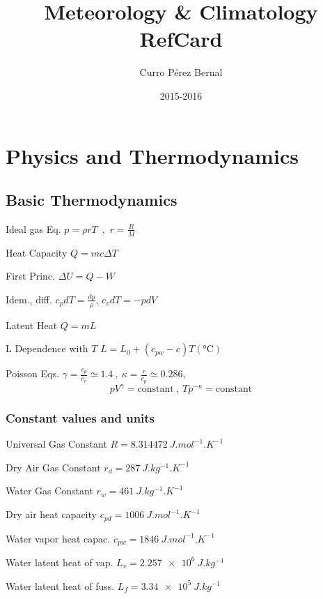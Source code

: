 \documentclass[10pt]{article}
\title{Meteorology \& Climatology RefCard}
\author{Curro Pérez Bernal}
\date{2015-2016}
\renewcommand{\maketitle}{%
{\begin{center}\Large \mythetitle\end{center}}
}
\newcommand{\gc}{\degreeCelsius}
\begin{document}
\begin{multicols}{3}
\maketitle

\section{Physics and Thermodynamics}

\subsection{Basic Thermodynamics}
\begin{ttdesc}[labelwidth=\widthof{\texttt{report}}]
\item[Ideal gas Eq.] $p = \rho r T$~,~$r = \frac{R}{M}$
\item[Heat Capacity] $Q = m c \Delta T$
\item[First Princ.] $\Delta U = Q - W$
\item[Idem., diff.] $c_pdT = \frac{dp}{\rho}$, $c_vdT = -pdV$
\item[Latent Heat] $Q = m L$
\item[L Dependence with $T$] $L=L_0 + (c_{pw}-c) T (\si{\gc})$
\item[Poisson Eqs.] $\gamma = \frac{c_p}{c_v}\simeq 1.4~,~\kappa = \frac{r}{c_p}\simeq 0.286$, 
\begin{displaymath}
  p V^\gamma = \text{constant}~,~T p^{-\kappa} = \text{constant}
\end{displaymath}
\end{ttdesc}
\subsubsection{Constant values and units}
%
\begin{ttdesc}[labelwidth=\widthof{\ttfamily{letterpaper/a4paper}}]
\item[Universal Gas Constant] $R = \SI{8.314472}{J.mol^{-1}.K^{-1}}$
\item[Dry Air Gas Constant] $r_d = \SI{287}{J.kg^{-1}.K^{-1}}$
\item[Water Gas Constant] $r_w = \SI{461}{J.kg^{-1}.K^{-1}}$
\item[Dry air heat capacity] $c_{pd} = \SI{1006}{J.mol^{-1}.K^{-1}}$
\item[Water vapor heat capac.] $c_{pw} = \SI{1846}{J.mol^{-1}.K^{-1}}$
\item[Water latent heat of vap.] $L_{v} = \SI{2.257e6}{J.kg^{-1}}$
\item[Water latent heat of fuss.] $L_{f} = \SI{3.34e5}{J.kg^{-1}}$
\end{ttdesc}


\end{multicols}
\end{document}
